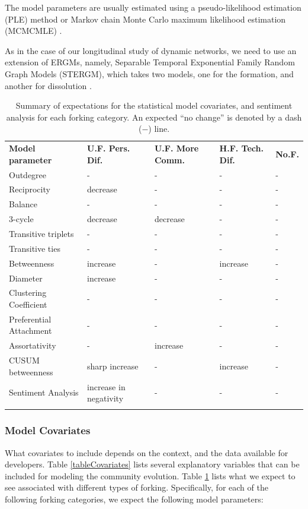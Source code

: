 \documentclass{acm_proc_article-sp}
\begin{document}
The model parameters are usually estimated using a pseudo-likelihood estimation (PLE) method or Markov chain Monte Carlo maximum likelihood estimation (MCMCMLE) \cite{SnijdersMCMCMLE}. 

As in the case of our longitudinal study of dynamic networks, we need to use an extension of ERGMs, namely, Separable Temporal Exponential Family Random Graph Models (STERGM), which takes two models, one for the formation, and another for dissolution \cite{Krivitsky}.


\begin{table} [!Ht]
\centering
\caption{Summary of expectations for the statistical model covariates, and sentiment analysis for each forking category. An expected ``no change'' is denoted by a dash ($-$) line.}
\label{tabelSummaryExpectationModelParameters}       
\begin{tabular}{m{} m{} m{} m{} m{}}
\hline\noalign{\smallskip}
\textbf{Model parameter} & \textbf{U.F. Pers. Dif.} & \textbf{U.F. More Comm.} & \textbf{H.F. Tech. Dif.} & \textbf{No.F.}\\
\noalign{\smallskip}\hline\noalign{\smallskip}
Outdegree & - & - & - & - \\ \hline
Reciprocity & decrease & - & - & - \\ \hline
Balance & - & - & - & - \\ \hline
3-cycle & decrease & decrease & - & - \\ \hline
Transitive triplets & - & - & - & - \\ \hline
Transitive ties & - & - & - & - \\ \hline
Betweenness & increase & - & increase & - \\ \hline
Diameter & increase & - & - & - \\ \hline
Clustering Coefficient & - & - & - & - \\ \hline
Preferential Attachment & - & - & - & - \\ \hline
Assortativity & - & increase & - & - \\ \hline
CUSUM betweenness & sharp increase & - & increase & - \\ \hline
Sentiment Analysis & increase in negativity & - & - & - \\
\noalign{\smallskip}\hline
\end{tabular}
\end{table}



\subsubsection{Model Covariates}
What covariates to include depends on the context, and the data available for developers.
Table \ref{tableCovariates} lists several explanatory variables that can be included for modeling the community evolution. Table \ref{tabelSummaryExpectationModelParameters} lists what we expect to see associated with different types of forking. Specifically, for each of the following forking categories, we expect the following model parameters:
\end{document}
